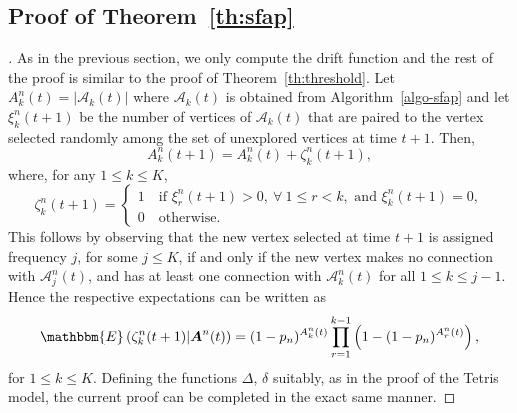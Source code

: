 \documentclass[11pt,a4paper, reqno]{article}
\begin{document}
\subsection{Proof of Theorem~\ref{th:sfap}}
\begin{proof}[\nopunct]
As in the previous section, we only compute the drift function and the rest of the proof is similar to the proof of Theorem~\ref{th:threshold}.
Let $A^n_k(t)=|\mathcal{A}_k(t)|$ where $\mathcal{A}_k(t)$ is obtained from Algorithm~\ref{algo-sfap} and let
 $\xi_k^n(t+1)$ be the number of vertices of $\mathcal{A}_k(t)$ that are paired to the vertex selected randomly among the set of unexplored vertices at time $t+1$.
Then,
 \begin{equation}
  A_k^n(t+1)=A_k^n(t)+\zeta_k^n(t+1),
 \end{equation}
 where, for any $1\leq k\leq K$,
 \begin{equation}
  \zeta_k^n(t+1)=
   \begin{cases}1 \quad \text{if } \xi_r^n(t+1)>0, \ \forall\ 1\leq r< k, \text{ and } \xi_{k}^n(t+1)=0,\\
   0 \quad  \text{otherwise}.
   \end{cases}
 \end{equation}
This follows by observing that the new vertex selected at time $t+1$ is assigned frequency $j$, for some $j\leq K$, if and only if the new vertex makes no connection with $\mathcal{A}^n_j(t)$, and has at least one connection with $\mathcal{A}_k^n(t)$ for all $1\leq k\leq j-1$. Hence the respective expectations can be written as
\begin{equation}
 {\mathbbm{E}\left({\zeta_k^n(t+1)|{\ensuremath{\boldsymbol{{A}}}}^n(t)}\right)}=(1-p_n)^{A_{k}^n(t)}\prod_{r=1}^{k-1}\left(1-(1-p_n)^{A_r^n(t)}\right),
\end{equation}
for $1\leq k\leq K$.
  Defining the functions $\Delta$, $\delta$ suitably, as in the proof of the Tetris model, the current proof can be completed in the exact same manner.
\end{proof}
\end{document}
